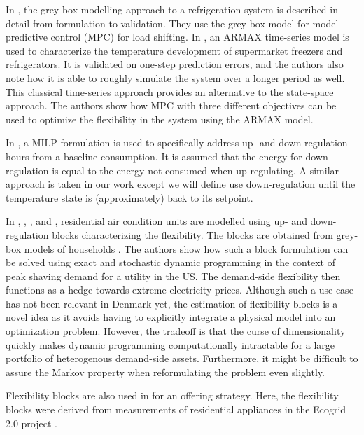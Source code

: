 In \cite{sossan2016grey}, the grey-box modelling approach to a refrigeration system is described in detail from formulation to validation. They use the grey-box model for model predictive control (MPC) for load shifting. In \cite{o2013modelling}, an ARMAX time-series model is used to characterize the temperature development of supermarket freezers and refrigerators. It is validated on one-step prediction errors, and the authors also note how it is able to roughly simulate the system over a longer period as well. This classical time-series approach provides an alternative to the state-space approach. The authors show how MPC with three different objectives can be used to optimize the flexibility in the system using the ARMAX model.

In \cite{de2019leveraging}, a MILP formulation is used to specifically address up- and down-regulation hours from a baseline consumption. It is assumed that the energy for down-regulation is equal to the energy not consumed when up-regulating. A similar approach is taken in our work except we will define use down-regulation until the temperature state is (approximately) back to its setpoint.


In \cite{schaperow2019simulation}, \cite{chanpiwat2020using}, \cite{moglen2020optimal}, and \cite{moglen2020optimal}, residential air condition units are modelled using up- and down-regulation blocks characterizing the flexibility. The blocks are obtained from grey-box models of households \cite{siemann2013performance}. The authors show how such a block formulation can be solved using exact and stochastic dynamic programming in the context of peak shaving demand for a utility in the US. The demand-side flexibility then functions as a hedge towards extreme electricity prices. Although such a use case has not been relevant in Denmark yet, the estimation of flexibility blocks is a novel idea as it avoids having to explicitly integrate a physical model into an optimization problem. However, the tradeoff is that the curse of dimensionality quickly makes dynamic programming computationally intractable for a large portfolio of heterogenous demand-side assets. Furthermore, it might be difficult to assure the Markov property \cite{MarkovProperty} when reformulating the problem even slightly.

Flexibility blocks are also used in \cite{bobo2018offering} for an offering strategy. Here, the flexibility blocks were derived from measurements of residential appliances in the Ecogrid 2.0 project \cite{ecogrid}.

